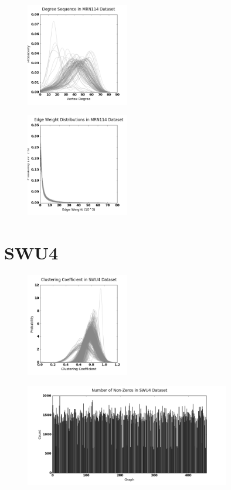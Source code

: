 \begin{figure}[h!]
\centering
\includegraphics[width=0.4\textwidth]{./stats/MRN114-degree.png}
\end{figure}

\begin{figure}[h!]
\centering
\includegraphics[width=0.4\textwidth]{./stats/MRN114-edgeweight.png}
\end{figure}

\clearpage
\section{SWU4}
\begin{figure}[h!]
\centering
\includegraphics[width=0.4\textwidth]{./stats/SWU4-cc.png}
\end{figure}

\begin{figure}[h!]
\centering
\includegraphics[width=0.8\textwidth]{./stats/SWU4-nnz.png}
\end{figure}

